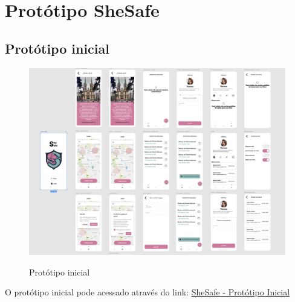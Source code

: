 \section{Protótipo SheSafe}

\subsection{Protótipo inicial}
\begin{figure}[h]
	\begin{center}
		\includegraphics[width=0.8\linewidth]{images/prototipo-inicial.png}\\
	\end{center}
	\caption[Protótipo inicial]{Protótipo inicial}
	\label{fig:prototipo-inicial}
\end{figure}
\pagebreak

O protótipo inicial pode acessado através do link: \href{https://www.figma.com/proto/ZOxt5eHuQt0RjhagaDpuXU/SheSafe?type=design&node-id=26-369&viewport=1892%2C1064%2C0.71&t=gZiNpzVt2mGhuMDV-0&scaling=min-zoom&starting-point-node-id=26%3A653}{SheSafe - Protótipo Inicial}

